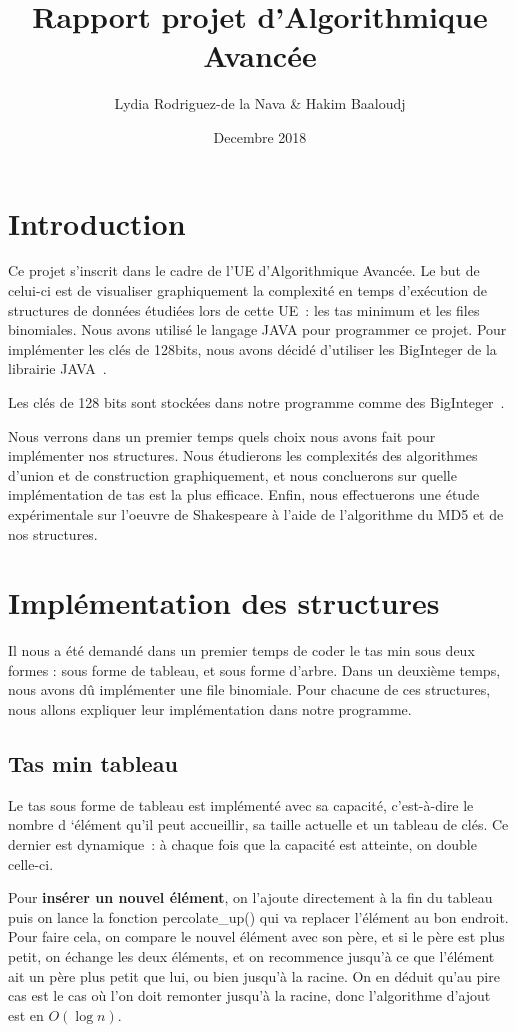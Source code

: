\documentclass{article}
\title{Rapport projet d'Algorithmique Avancée}
\author{Lydia Rodriguez-de la Nava \& Hakim Baaloudj }
\date{Decembre 2018}
\begin{document}
\maketitle

\section{Introduction}
Ce projet s’inscrit dans le cadre de l’UE d’Algorithmique Avancée. Le but de celui-ci est de visualiser graphiquement la complexité en temps d’exécution de structures de données étudiées lors de cette UE : les tas minimum et les files binomiales. 
Nous avons utilisé le langage JAVA pour programmer ce projet.
Pour implémenter les clés de 128bits, nous avons décidé d’utiliser les BigInteger de la librairie JAVA .

Les clés de 128 bits sont stockées dans notre programme comme des BigInteger .

Nous verrons dans un premier temps quels choix nous avons fait pour implémenter nos structures. Nous étudierons les complexités des algorithmes d'union et de construction graphiquement, et nous concluerons sur quelle implémentation de tas est la plus efficace. Enfin, nous effectuerons une étude expérimentale sur l'oeuvre de Shakespeare à l'aide de l'algorithme du MD5 et de nos structures.
\section{Implémentation des structures}

Il nous a été demandé dans un premier temps de coder le tas min sous deux formes : sous forme de tableau, et sous forme d'arbre. Dans un deuxième temps, nous avons dû implémenter une file binomiale. Pour chacune de ces structures, nous allons expliquer leur implémentation dans notre programme.

\subsection{Tas min tableau}

Le tas sous forme de tableau est implémenté avec sa capacité, c’est-à-dire le nombre d ‘élément qu’il peut accueillir, sa taille actuelle et un tableau de clés. Ce dernier est dynamique : à chaque fois que la capacité est atteinte, on double celle-ci.

Pour \textbf{insérer un nouvel élément}, on l’ajoute directement à la fin du tableau puis on lance la fonction percolate\_up() qui va replacer l’élément au bon endroit. Pour faire cela, on compare le nouvel élément avec son père, et si le père est plus petit, on échange les deux éléments, et on recommence jusqu’à ce que l’élément ait un père plus petit que lui, ou bien jusqu’à la racine. On en déduit qu’au pire cas est le cas où l’on doit remonter jusqu’à la racine, donc l’algorithme d’ajout est en $O(\log{}n)$. 
\end{document}
